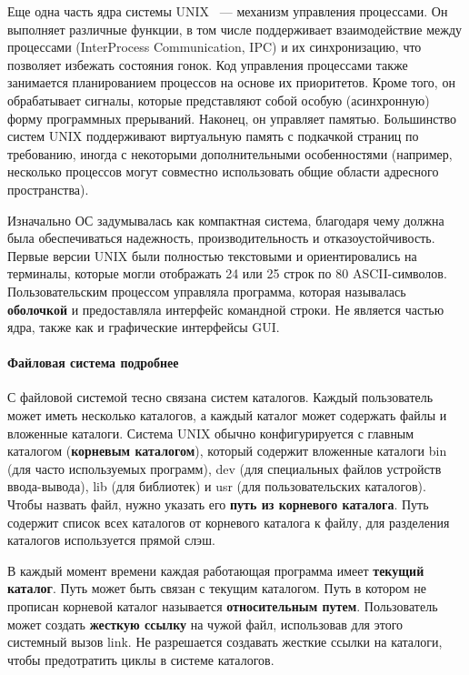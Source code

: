 \documentclass[10pt]{article}
\begin{document}
	Еще одна часть ядра системы UNIX ~--- механизм управления процессами. Он выполняет различные функции, в том числе поддерживает взаимодействие между процессами (InterProcess Communication, IPC) и их синхронизацию, что позволяет избежать состояния гонок. Код управления процессами также занимается планированием процессов на основе их приоритетов. Кроме того, он обрабатывает сигналы, которые представляют собой особую (асинхронную) форму программных прерываний. Наконец, он управляет памятью. Большинство систем UNIX поддерживают виртуальную память с подкачкой страниц по требованию, иногда с некоторыми дополнительными особенностями (например, несколько процессов могут совместно использовать общие области адресного пространства).

	Изначально ОС задумывалась как компактная система, благодаря чему должна была обеспечиваться надежность, производительность и отказоустойчивость. Первые версии UNIX были полностью текстовыми и ориентировались на терминалы, которые могли отображать 24 или 25 строк по 80 ASCII-символов. Пользовательским процессом управляла программа, которая называлась \textbf{оболочкой} и предоставляла интерфейс командной строки. Не является частью ядра, также как и графические интерфейсы GUI.
	\paragraph{Файловая система подробнее}
	С файловой системой тесно связана систем каталогов. Каждый пользователь может иметь несколько каталогов, а каждый каталог может содержать файлы и вложенные каталоги. Система UNIX обычно конфигурируется с главным каталогом (\textbf{корневым каталогом}), который содержит вложенные каталоги bin (для часто используемых программ), dev (для специальных файлов устройств ввода-вывода), lib (для библиотек) и usr (для пользовательских каталогов). Чтобы назвать файл, нужно указать его \textbf{путь из корневого каталога}. Путь содержит список всех каталогов от корневого каталога к файлу, для разделения каталогов используется прямой слэш.

	В каждый момент времени каждая работающая программа имеет \textbf{текущий каталог}. Путь может быть связан с текущим каталогом. Путь в котором не прописан корневой каталог называется \textbf{относительным путем}. Пользователь может создать \textbf{ жесткую ссылку} на чужой файл, использовав для этого системный вызов link. Не разрешается создавать жесткие ссылки на каталоги, чтобы предотратить циклы в системе каталогов.
\end{document}

